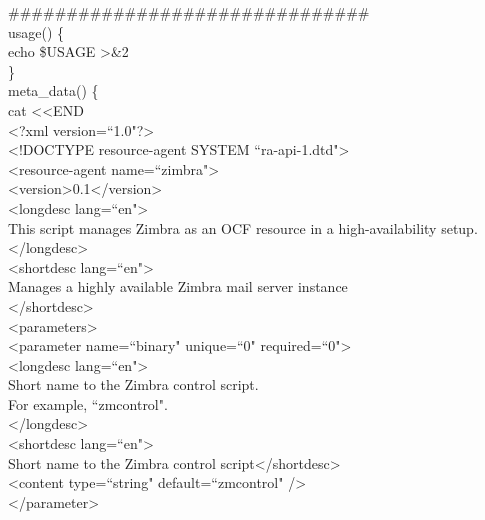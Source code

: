 \documentclass[a4paper, 12pt]{book}
\begin{document}
\noindent \#\#\#\#\#\#\#\#\#\#\#\#\#\#\#\#\#\#\#\#\#\#\#\#\#\#\#\#\#\#\#\\

\noindent usage() \{\\
    \indent echo \$USAGE \textgreater\&2\\
\}\\

\noindent meta\_data() \{\\

        cat \textless \textless END\\
        
\textless ?xml version=``1.0"?\textgreater\\
\textless !DOCTYPE resource-agent SYSTEM ``ra-api-1.dtd"\textgreater\\
\textless resource-agent name=``zimbra"\textgreater\\
\textless version\textgreater0.1\textless /version\textgreater\\
\textless longdesc lang=``en"\textgreater\\
This script manages Zimbra as an OCF resource in a high-availability setup.\\
\textless /longdesc\textgreater\\
\textless shortdesc lang=``en"\textgreater\\
Manages a highly available Zimbra mail server instance\\
\textless /shortdesc\textgreater\\

\noindent \textless parameters\textgreater\\

\noindent \textless parameter name=``binary" unique=``0" required=``0"\textgreater\\
\textless longdesc lang=``en"\textgreater\\
Short name to the Zimbra control script.\\
For example, ``zmcontrol".\\
\textless /longdesc\textgreater\\
\textless shortdesc lang=``en"\textgreater\\
Short name to the Zimbra control script\textless /shortdesc\textgreater\\
\textless content type=``string" default=``zmcontrol" /\textgreater\\
\textless /parameter\textgreater\\
\end{document}
